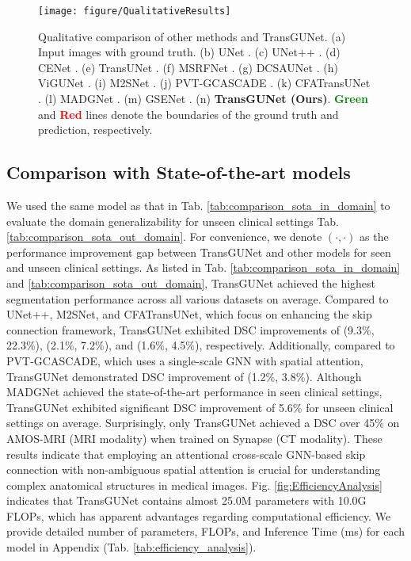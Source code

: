 \begin{figure*}[t]
    \centering
    \texttt{[image: figure/QualitativeResults]}
    \caption{Qualitative comparison of other methods and TransGUNet.  (a) Input images with ground truth. (b) UNet \cite{ronneberger2015u}. (c) UNet++ \cite{zhou2018unet++}. (d) CENet \cite{gu2019net}. (e) TransUNet \cite{chen2021transunet}. (f) MSRFNet \cite{srivastava2021msrf}. (g) DCSAUNet \cite{xu2023dcsau}. (h) ViGUNet \cite{jiang2023vig}. (i) M2SNet \cite{zhao2023m}. (j) PVT-GCASCADE \cite{rahman2024g}. (k) CFATransUNet \cite{wang2024cfatransunet}. (l) MADGNet \cite{nam2024modality}. (m) GSENet \cite{li2025gse}. (n) \textbf{TransGUNet (Ours)}. \textcolor{green}{\textbf{Green}} and \textcolor{red}{\textbf{Red}} lines denote the boundaries of the ground truth and prediction, respectively.} \vspace{-0.25cm}
    \label{fig:QualitativeResults}
\end{figure*}

\subsection{Comparison with State-of-the-art models}

We used the same model as that in Tab. \ref{tab:comparison_sota_in_domain} to evaluate the domain generalizability for unseen clinical settings Tab. \ref{tab:comparison_sota_out_domain}. For convenience, we denote $( \cdot, \cdot )$ as the performance improvement gap between TransGUNet and other models for seen and unseen clinical settings. As listed in Tab. \ref{tab:comparison_sota_in_domain} and \ref{tab:comparison_sota_out_domain}, TransGUNet achieved the highest segmentation performance across all various datasets on average. Compared to UNet++, M2SNet, and CFATransUNet, which focus on enhancing the skip connection framework, TransGUNet exhibited DSC improvements of (9.3\%, 22.3\%), (2.1\%, 7.2\%), and (1.6\%, 4.5\%), respectively. Additionally, compared to PVT-GCASCADE, which uses a single-scale GNN with spatial attention, TransGUNet demonstrated DSC improvement of (1.2\%, 3.8\%). Although MADGNet achieved the state-of-the-art performance in seen clinical settings, TransGUNet exhibited significant DSC improvement of 5.6\% for unseen clinical settings on average. Surprisingly, only TransGUNet achieved a DSC over 45\% on AMOS-MRI (MRI modality) when trained on Synapse (CT modality). These results indicate that employing an attentional cross-scale GNN-based skip connection with non-ambiguous spatial attention is crucial for understanding complex anatomical structures in medical images. Fig. \ref{fig:EfficiencyAnalysis} indicates that TransGUNet contains almost 25.0M parameters with 10.0G FLOPs, which has apparent advantages regarding computational efficiency. We provide detailed number of parameters, FLOPs, and Inference Time (ms) for each model in Appendix (Tab. \ref{tab:efficiency_analysis}).

